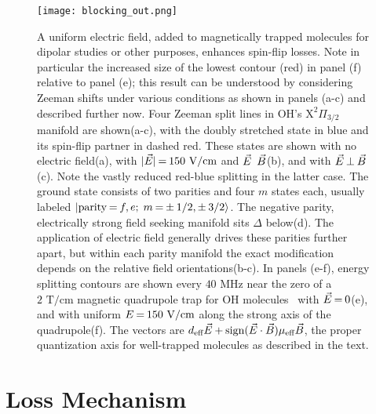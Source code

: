 \documentclass[%
 reprint,
 amsmath,amssymb,
 aps,
pra,
]{revtex4-1}
\newcommand{\epb}{{$\vec{E}\s {\perp}\s\vec{B}$}}
\newcommand{\s}{{\nobreak\hspace{.2em}}}
\begin{document}
\begin{figure}[tb]
\texttt{[image: blocking\_out.png]}%
\caption{
A uniform electric field, added to magnetically trapped molecules for dipolar studies or other purposes, enhances spin-flip losses.
Note in particular the increased size of the lowest contour (red) in panel (f) relative to panel (e); this result can be understood by considering Zeeman shifts under various conditions as shown in panels (a-c) and described further now.
Four Zeeman split lines in OH's $\mathrm{X}^2\Pi_{3/2}$ manifold are shown\s(a-c), with the doubly stretched state in blue and its spin-flip partner in dashed red.
These states are shown with no electric field\s(a), with $|\vec{E}|\s {=}\s 150\text{ V/cm}$ and $\vec{E}\s $\protect\raisebox{1px}{${\parallel}$}$\s\vec{B}$\s(b), and with \epb{}\s(c).
Note the vastly reduced red-blue splitting in the latter case.
The ground state consists of two parities and four $m$ states each, usually labeled $|\text{parity}\s {=}\s f,e;\;m\s {=}\s{\pm}\s 1/2,{\pm}\s 3/2\rangle$.
The negative parity, electrically strong field seeking manifold sits $\Delta$ below\s(d).
The application of electric field generally drives these parities further apart, but within each parity manifold the exact modification depends on the relative field orientations\s(b-c).
In panels (e-f), energy splitting contours are shown every $40\text{ MHz}$ near the zero of a $2\text{ T/cm}$ magnetic quadrupole trap for OH molecules~\cite{Stuhl2012uwave} with $\vec{E}\s {=}\s 0$\s(e), and with uniform $E\s {=}\s 150\text{ V/cm}$ along the strong axis of the quadrupole\s(f).
The vectors are $d_\text{eff}\vec{E}\s {+}\s\text{sign}(\vec{E}\cdot\vec{B})\mu_\text{eff}\vec{B}$, the proper quantization axis for well-trapped molecules as described in the text.
}
\label{fig:blocking}
\end{figure}

\section{Loss Mechanism\label{sec:mech}}
\end{document}
